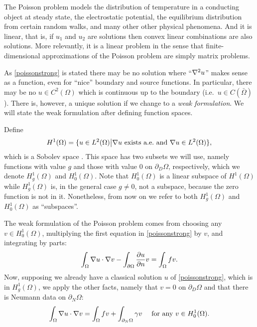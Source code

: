 The Poisson problem models the distribution of temperature in a conducting object at steady state, the electrostatic potential, the equilibrium distribution from certain random walks, and many other other physical phenomena.  And it is linear, that is, if $u_1$ and $u_2$ are solutions then convex linear combinations are also solutions.  More relevantly, it is a linear problem in the sense that finite-dimensional approximations of the Poisson problem are simply matrix problems.

As \eqref{poissonstrong} is stated there may be no solution where ``$\nabla^2 u$'' makes sense as a function, even for ``nice'' boundary and source functions.  In particular, there may be no $u\in C^2(\Omega)$ which is continuous up to the boundary (i.e.~$u\in C(\bar\Omega)$).  There is, however, a unique solution if we change to a \emph{weak formulation}.  We will state the weak formulation after defining function spaces.

Define
    $$H^1(\Omega) = \{u\in L^2(\Omega) \big| \nabla u \text{ exists a.e.~and } \nabla u \in L^2(\Omega)\},$$
which is a Sobolev space \citep{Evans}.  This space has two subsets we will use, namely functions with value $g$ and those with value $0$ on $\partial_D \Omega$, respectively, which we denote $H_g^1(\Omega)$ and $H_0^1(\Omega)$.  Note that $H_0^1(\Omega)$ is a linear subspace of $H^1(\Omega)$ while $H_g^1(\Omega)$ is, in the general case $g\ne 0$, not a subspace, because the zero function is not in it.  Nonetheless, from now on we refer to both $H_g^1(\Omega)$ and $H_0^1(\Omega)$ as ``subspaces''.

The weak formulation of the Poisson problem comes from choosing any $v\in H_0^1(\Omega)$, multiplying the first equation in \eqref{poissonstrong} by $v$, and integrating by parts:
\begin{equation*}
\int_\Omega \nabla u \cdot \nabla v - \int_{\partial\Omega} \frac{\partial u}{\partial n} v = \int_\Omega f v.
\end{equation*}
Now, supposing we already have a classical solution $u$ of \eqref{poissonstrong}, which is in $H_g^1(\Omega)$, we apply the other facts, namely that $v=0$ on $\partial_D\Omega$ and that there is Neumann data on $\partial_N\Omega$:
\begin{equation}
\int_\Omega \nabla u \cdot \nabla v = \int_\Omega f v + \int_{\partial_N\Omega} \gamma v\quad \text{ for any } v\in H_0^1(\Omega). \label{poissonweak}
\end{equation}


